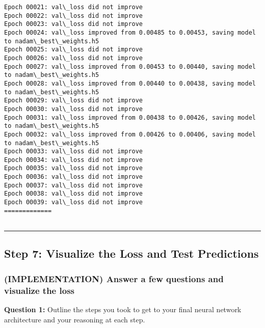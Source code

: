 \documentclass[11pt]{article}
\begin{document}
\begin{Verbatim}[commandchars=\\\{\}]
Epoch 00021: val\_loss did not improve
Epoch 00022: val\_loss did not improve
Epoch 00023: val\_loss did not improve
Epoch 00024: val\_loss improved from 0.00485 to 0.00453, saving model to nadam\_best\_weights.h5
Epoch 00025: val\_loss did not improve
Epoch 00026: val\_loss did not improve
Epoch 00027: val\_loss improved from 0.00453 to 0.00440, saving model to nadam\_best\_weights.h5
Epoch 00028: val\_loss improved from 0.00440 to 0.00438, saving model to nadam\_best\_weights.h5
Epoch 00029: val\_loss did not improve
Epoch 00030: val\_loss did not improve
Epoch 00031: val\_loss improved from 0.00438 to 0.00426, saving model to nadam\_best\_weights.h5
Epoch 00032: val\_loss improved from 0.00426 to 0.00406, saving model to nadam\_best\_weights.h5
Epoch 00033: val\_loss did not improve
Epoch 00034: val\_loss did not improve
Epoch 00035: val\_loss did not improve
Epoch 00036: val\_loss did not improve
Epoch 00037: val\_loss did not improve
Epoch 00038: val\_loss did not improve
Epoch 00039: val\_loss did not improve
=============


    \end{Verbatim}

    \begin{center}\rule{0.5\linewidth}{\linethickness}\end{center}

\hypertarget{step-7-visualize-the-loss-and-test-predictions}{%
\subsection{Step 7: Visualize the Loss and Test
Predictions}\label{step-7-visualize-the-loss-and-test-predictions}}

    \hypertarget{implementation-answer-a-few-questions-and-visualize-the-loss}{%
\subsubsection{(IMPLEMENTATION) Answer a few questions and visualize the
loss}\label{implementation-answer-a-few-questions-and-visualize-the-loss}}

\textbf{Question 1:} Outline the steps you took to get to your final
neural network architecture and your reasoning at each step.
\end{document}
